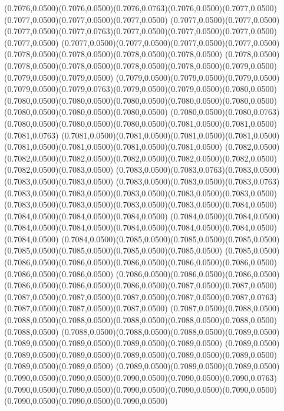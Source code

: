 (0.7076,0.0500)(0.7076,0.0500)(0.7076,0.0763)(0.7076,0.0500)(0.7077,0.0500)(0.7077,0.0500)(0.7077,0.0500)(0.7077,0.0500)
(0.7077,0.0500)(0.7077,0.0500)(0.7077,0.0500)(0.7077,0.0763)(0.7077,0.0500)(0.7077,0.0500)(0.7077,0.0500)(0.7077,0.0500)
(0.7077,0.0500)(0.7077,0.0500)(0.7077,0.0500)(0.7077,0.0500)(0.7078,0.0500)(0.7078,0.0500)(0.7078,0.0500)(0.7078,0.0500)
(0.7078,0.0500)(0.7078,0.0500)(0.7078,0.0500)(0.7078,0.0500)(0.7078,0.0500)(0.7079,0.0500)(0.7079,0.0500)(0.7079,0.0500)
(0.7079,0.0500)(0.7079,0.0500)(0.7079,0.0500)(0.7079,0.0500)(0.7079,0.0763)(0.7079,0.0500)(0.7079,0.0500)(0.7080,0.0500)
(0.7080,0.0500)(0.7080,0.0500)(0.7080,0.0500)(0.7080,0.0500)(0.7080,0.0500)(0.7080,0.0500)(0.7080,0.0500)(0.7080,0.0500)
(0.7080,0.0500)(0.7080,0.0763)(0.7080,0.0500)(0.7080,0.0500)(0.7080,0.0500)(0.7081,0.0500)(0.7081,0.0500)(0.7081,0.0763)
(0.7081,0.0500)(0.7081,0.0500)(0.7081,0.0500)(0.7081,0.0500)(0.7081,0.0500)(0.7081,0.0500)(0.7081,0.0500)(0.7081,0.0500)
(0.7082,0.0500)(0.7082,0.0500)(0.7082,0.0500)(0.7082,0.0500)(0.7082,0.0500)(0.7082,0.0500)(0.7082,0.0500)(0.7083,0.0500)
(0.7083,0.0500)(0.7083,0.0763)(0.7083,0.0500)(0.7083,0.0500)(0.7083,0.0500)
\PST@Solid(0.7083,0.0500)(0.7083,0.0500)(0.7083,0.0763)(0.7083,0.0500)(0.7083,0.0500)(0.7083,0.0500)(0.7083,0.0500)(0.7083,0.0500)
(0.7083,0.0500)(0.7083,0.0500)(0.7083,0.0500)(0.7083,0.0500)(0.7084,0.0500)(0.7084,0.0500)(0.7084,0.0500)(0.7084,0.0500)
(0.7084,0.0500)(0.7084,0.0500)(0.7084,0.0500)(0.7084,0.0500)(0.7084,0.0500)(0.7084,0.0500)(0.7084,0.0500)(0.7084,0.0500)
(0.7084,0.0500)(0.7085,0.0500)(0.7085,0.0500)(0.7085,0.0500)(0.7085,0.0500)(0.7085,0.0500)(0.7085,0.0500)(0.7085,0.0500)
(0.7085,0.0500)(0.7086,0.0500)(0.7086,0.0500)(0.7086,0.0500)(0.7086,0.0500)(0.7086,0.0500)(0.7086,0.0500)(0.7086,0.0500)
(0.7086,0.0500)(0.7086,0.0500)(0.7086,0.0500)(0.7086,0.0500)(0.7086,0.0500)(0.7086,0.0500)(0.7087,0.0500)(0.7087,0.0500)
(0.7087,0.0500)(0.7087,0.0500)(0.7087,0.0500)(0.7087,0.0500)(0.7087,0.0763)(0.7087,0.0500)(0.7087,0.0500)(0.7087,0.0500)
(0.7087,0.0500)(0.7088,0.0500)(0.7088,0.0500)(0.7088,0.0500)(0.7088,0.0500)(0.7088,0.0500)(0.7088,0.0500)(0.7088,0.0500)
(0.7088,0.0500)(0.7088,0.0500)(0.7088,0.0500)(0.7089,0.0500)(0.7089,0.0500)(0.7089,0.0500)(0.7089,0.0500)(0.7089,0.0500)
(0.7089,0.0500)(0.7089,0.0500)(0.7089,0.0500)(0.7089,0.0500)(0.7089,0.0500)(0.7089,0.0500)(0.7089,0.0500)(0.7089,0.0500)
(0.7089,0.0500)(0.7089,0.0500)(0.7089,0.0500)(0.7090,0.0500)(0.7090,0.0500)(0.7090,0.0500)(0.7090,0.0500)(0.7090,0.0763)
(0.7090,0.0500)(0.7090,0.0500)(0.7090,0.0500)(0.7090,0.0500)(0.7090,0.0500)(0.7090,0.0500)(0.7090,0.0500)(0.7090,0.0500)
